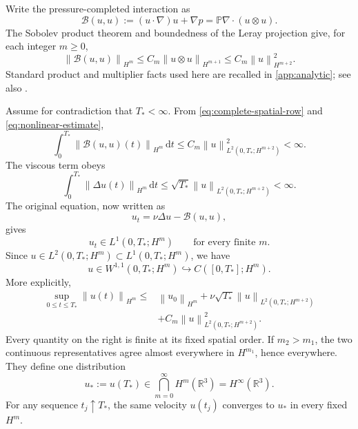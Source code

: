 \documentclass[11pt]{article}
\theoremstyle{definition}
\theoremstyle{remark}
\newcommand{\R}{\mathbb R}
\newcommand{\Leray}{\mathbb P}
\newcommand{\norm}[1]{\left\lVert #1\right\rVert}
\newcommand{\dd}{\,\mathrm d}
\begin{document}
Write the pressure-completed interaction as
\begin{equation}
 \mathcal B(u,u)
 :=(u\cdot\nabla)u+\nabla p
 =\Leray\nabla\cdot(u\otimes u).
 \label{eq:B}
\end{equation}
The Sobolev product theorem and boundedness of the Leray projection give, for
each integer \(m\geq0\),
\begin{equation}
 \norm{\mathcal B(u,u)}_{H^m}
 \leq C_m\norm{u\otimes u}_{H^{m+1}}
 \leq C_m\norm{u}_{H^{m+2}}^2.
 \label{eq:nonlinear-estimate}
\end{equation}
Standard product and multiplier facts used here are recalled in
\cref{app:analytic}; see also \cite{BCD,Stein}.

Assume for contradiction that \(T_*<\infty\).  From
\eqref{eq:complete-spatial-row} and \eqref{eq:nonlinear-estimate},
\begin{equation}
 \int_0^{T_*}\norm{\mathcal B(u,u)(t)}_{H^m}\dd t
 \leq C_m\norm{u}_{L^2(0,T_*;H^{m+2})}^2<\infty.
 \label{eq:B-L1}
\end{equation}
The viscous term obeys
\begin{equation}
 \int_0^{T_*}\norm{\Delta u(t)}_{H^m}\dd t
 \leq \sqrt{T_*}\norm{u}_{L^2(0,T_*;H^{m+2})}<\infty.
 \label{eq:Delta-L1}
\end{equation}
The original equation, now written as
\[
 u_t=\nu\Delta u-\mathcal B(u,u),
\]
gives
\begin{equation}
 u_t\in L^1(0,T_*;H^m)
 \qquad\text{for every finite }m.
 \label{eq:ut-L1}
\end{equation}
Since \(u\in L^2(0,T_*;H^m)\subset L^1(0,T_*;H^m)\), we have
\begin{equation}
 u\in W^{1,1}(0,T_*;H^m)
 \hookrightarrow C([0,T_*];H^m).
 \label{eq:W11-endpoint}
\end{equation}
More explicitly,
\begin{equation}
\begin{aligned}
 \sup_{0\leq t\leq T_*}\norm{u(t)}_{H^m}
 \leq{}&\norm{u_0}_{H^m}
 +\nu\sqrt{T_*}\norm{u}_{L^2(0,T_*;H^{m+2})}
 \\
 &+C_m\norm{u}_{L^2(0,T_*;H^{m+2})}^2.
\end{aligned}
\label{eq:endpoint-bound}
\end{equation}
Every quantity on the right is finite at its fixed spatial order.  If
\(m_2>m_1\), the two continuous representatives agree almost everywhere in
\(H^{m_1}\), hence everywhere.  They define one distribution
\begin{equation}
 u_*:=u(T_*)\in\bigcap_{m=0}^{\infty}H^m(\R^3)=H^\infty(\R^3).
 \label{eq:endpoint}
\end{equation}
For any sequence \(t_j\uparrow T_*\), the same velocity \(u(t_j)\) converges
to \(u_*\) in every fixed \(H^m\).
\end{document}

